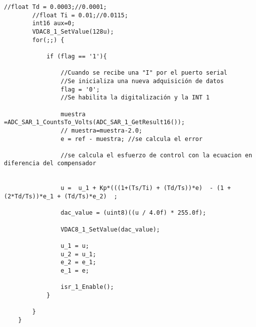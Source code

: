 \begin{lstlisting}[style=cstyle,caption={Ejemplo en C},label={lst:c}]
		//float Td = 0.0003;//0.0001;
		//float Ti = 0.01;//0.0115;
		int16 aux=0;
		VDAC8_1_SetValue(128u);
		for(;;) {
			
			if (flag == '1'){
				
				//Cuando se recibe una "I" por el puerto serial
				//Se inicializa una nueva adquisición de datos
				flag = '0'; 
				//Se habilita la digitalización y la INT 1   
				
				muestra =ADC_SAR_1_CountsTo_Volts(ADC_SAR_1_GetResult16());
				// muestra=muestra-2.0;
				e = ref - muestra; //se calcula el error
				
				//se calcula el esfuerzo de control con la ecuacion en diferencia del compensador
				
				
				u =  u_1 + Kp*(((1+(Ts/Ti) + (Td/Ts))*e)  - (1 +(2*Td/Ts))*e_1 + (Td/Ts)*e_2)  ; 
				
				dac_value = (uint8)((u / 4.0f) * 255.0f);
				
				VDAC8_1_SetValue(dac_value);           
				
				u_1 = u;
				u_2 = u_1;
				e_2 = e_1;
				e_1 = e;
				
				isr_1_Enable();
			}
			
		}
	}
	
\end{lstlisting}
